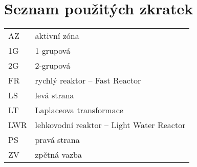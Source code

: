 \section*{Seznam použitých zkratek}

\renewcommand{\arraystretch}{1.2}
\begin{table}[H]
\begin{tabular}{p{1cm}l}
  AZ           & aktivní zóna \\
  1G           & 1-grupová \\
  2G           & 2-grupová \\
  FR           & rychlý reaktor -- Fast Reactor \\
  LS           & levá strana \\
  LT           & Laplaceova transformace \\
  LWR          & lehkovodní reaktor -- Light Water Reactor \\
  PS           & pravá strana \\
  ZV           & zpětná vazba \\
\end{tabular}
\end{table}
\renewcommand{\arraystretch}{1}
